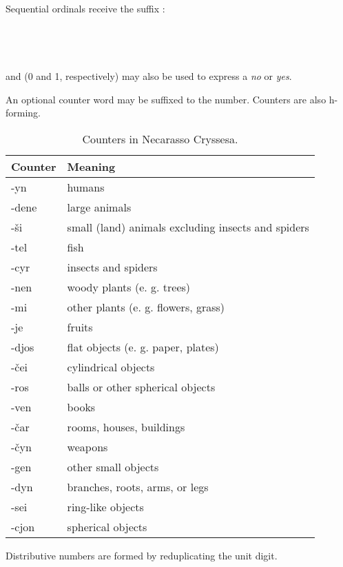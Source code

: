 \documentclass{book}
\begin{document}
Sequential ordinals receive the suffix : \\
~\\
    \\
    \\
    \\

 and  (0 and 1, respectively) may also be used to express a \emph{no} or \emph{yes}.

An optional counter word may be suffixed to the number. Counters are also h-forming.

\begin{table}[h]
  \caption{Counters in Necarasso Cryssesa.}
  \centering
	\begin{tabular}{|l|l|}
	  \hline
	  Counter & Meaning \\ \hline
	  -yn & humans \\
	  -dene & large animals \\
	  -ši & small (land) animals excluding insects and spiders \\
	  -tel & fish \\
	  -cyr & insects and spiders \\
	  -nen & woody plants (e. g. trees) \\
	  -mi & other plants (e. g. flowers, grass) \\
	  -je & fruits \\
	  -djos & flat objects (e. g. paper, plates) \\
	  -čei & cylindrical objects \\
	  -ros & balls or other spherical objects \\
	  -ven & books \\
	  -čar & rooms, houses, buildings \\
	  -čyn & weapons \\
	  -gen & other small objects \\
	  -dyn & branches, roots, arms, or legs \\
	  -sei & ring-like objects \\
	  -cjon & spherical objects \\ \hline
	\end{tabular}
\end{table}

Distributive numbers are formed by reduplicating the unit digit.
\end{document}
